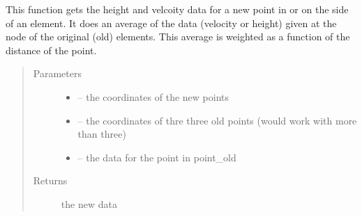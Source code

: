 \documentclass[letterpaper,10pt,english]{sphinxmanual}
\begin{document}

\begin{fulllineitems}
\label{\detokenize{index:src.mesh_grid2.get_new_vel_height_data}}
This function gets the height and velcoity data for a new point in or on the side of an element. It does an
average of the data (velocity or height) given at the node of the original (old) elements. This average is weighted
as a function of the distance of the point.
\begin{quote}\begin{description}
\item[{Parameters}] \leavevmode\begin{itemize}
\item {} 
 -- the coordinates of the new points

\item {} 
 -- the coordinates of thre three old points (would work with more than three)

\item {} 
 -- the data for the point in point\_old

\end{itemize}

\item[{Returns}] \leavevmode
the new data

\end{description}\end{quote}

\end{fulllineitems}

\end{document}
